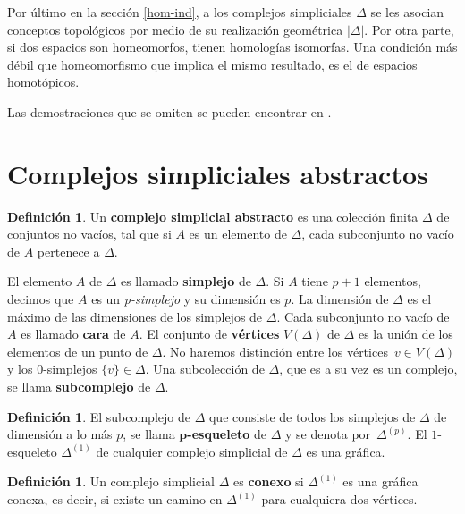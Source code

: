 \documentclass[12pt]{book}
\theoremstyle{definition}
\newtheorem{definition}[theorem]{Definición}
\newcounter{in}
\newcounter{ini}
\begin{document}
Por último en la sección \ref{hom-ind}, a los complejos simpliciales
$\Delta$ se les asocian conceptos topológicos por medio de su
realización geométrica $|\Delta|$. Por otra parte, si dos espacios son
homeomorfos, tienen homologías isomorfas. Una condición más débil que
homeomorfismo que implica el mismo resultado, es el de espacios
homotópicos.

Las demostraciones que se omiten se pueden encontrar en
\cite{munkres1984elements}.

\section{Complejos simpliciales abstractos}
\label{com-sim-abs}

\begin{definition}
Un \textbf{complejo simplicial abstracto} es una colección finita
$\Delta$ de conjuntos no vacíos, tal que si $A$ es un elemento de $\Delta$,
cada subconjunto no vacío de $A$ pertenece a $\Delta$.
\end{definition}

El elemento $A$ de $\Delta$ es llamado \textbf{simplejo} de
$\Delta$. Si $A$ tiene $p+1$ elementos, decimos que $A$ es un
\emph{p-simplejo} y su dimensión es $p$. La dimensión de $\Delta$
es el máximo de las dimensiones de los simplejos de $\Delta$. Cada
subconjunto no vacío de $A$ es llamado \textbf{cara} de $A$. El
conjunto de \textbf{vértices} $V(\Delta)$ de $\Delta$ es la unión de los
elementos de un punto de $\Delta$. No haremos distinción entre los
vértices~$v\in V(\Delta)$ y los $0$-simplejos $\{v\}\in \Delta$. Una
subcolección de $\Delta$, que es a su vez es un complejo, se llama
\textbf{subcomplejo} de $\Delta$.

\begin{definition}
  El subcomplejo de $\Delta$ que consiste de todos los simplejos de
  $\Delta$ de dimensión a lo más $p$, se llama \textbf{$\boldsymbol{p}$-esqueleto} de
  $\Delta$ y se denota por~$\Delta^{(p)}$. El $1$-esqueleto
  $\Delta^{(1)}$ de cualquier complejo simplicial de $\Delta$ es una
  gráfica.
\end{definition}

\begin{definition}
  Un complejo simplicial $\Delta$ es \textbf{conexo} si
  $\Delta^{(1)}$ es una gráfica conexa, es decir, si existe un camino en
  $\Delta^{(1)}$  para cualquiera dos vértices.
\end{definition}
\end{document}
